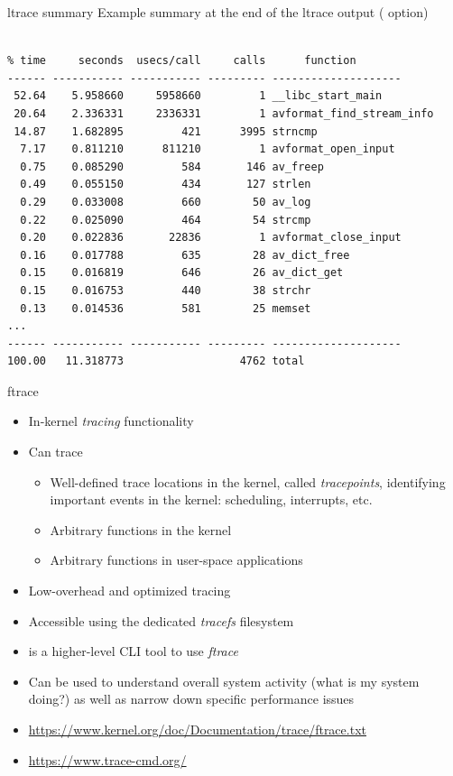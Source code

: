 \begin{frame}[fragile]{ltrace summary}
  Example summary at the end of the ltrace output ( option)
  \scriptsize
  \begin{block}{}
\begin{verbatim}

% time     seconds  usecs/call     calls      function
------ ----------- ----------- --------- --------------------
 52.64    5.958660     5958660         1 __libc_start_main
 20.64    2.336331     2336331         1 avformat_find_stream_info
 14.87    1.682895         421      3995 strncmp
  7.17    0.811210      811210         1 avformat_open_input
  0.75    0.085290         584       146 av_freep
  0.49    0.055150         434       127 strlen
  0.29    0.033008         660        50 av_log
  0.22    0.025090         464        54 strcmp
  0.20    0.022836       22836         1 avformat_close_input
  0.16    0.017788         635        28 av_dict_free
  0.15    0.016819         646        26 av_dict_get
  0.15    0.016753         440        38 strchr
  0.13    0.014536         581        25 memset
...
------ ----------- ----------- --------- --------------------
100.00   11.318773                  4762 total
\end{verbatim}
  \end{block}
\end{frame}

\begin{frame}{ftrace}
  \begin{itemize}
  \item In-kernel {\em tracing} functionality
  \item Can trace
    \begin{itemize}
    \item Well-defined trace locations in the kernel, called {\em
        tracepoints}, identifying important events in the kernel:
      scheduling, interrupts, etc.
    \item Arbitrary functions in the kernel
    \item Arbitrary functions in user-space applications
    \end{itemize}
  \item Low-overhead and optimized tracing
  \item Accessible using the dedicated {\em tracefs} filesystem
  \item {} is a higher-level CLI tool to use {\em
      ftrace}
  \item Can be used to understand overall system activity (what is my
    system doing?) as well as narrow down specific performance
    issues
  \item \url{https://www.kernel.org/doc/Documentation/trace/ftrace.txt}
  \item \url{https://www.trace-cmd.org/}
  \end{itemize}
\end{frame}

